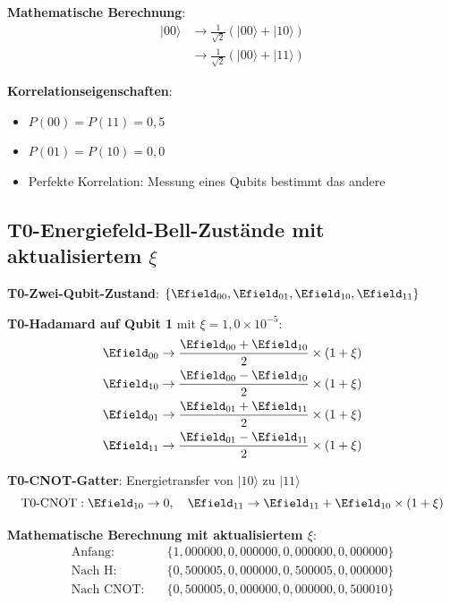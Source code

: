 	\textbf{Mathematische Berechnung}:
	\begin{align}
		|00\rangle &\rightarrow \frac{1}{\sqrt{2}}(|00\rangle + |10\rangle) \\
		&\rightarrow \frac{1}{\sqrt{2}}(|00\rangle + |11\rangle)
	\end{align}
	
	\textbf{Korrelationseigenschaften}:
	\begin{itemize}
		\item $P(00) = P(11) = 0,5$
		\item $P(01) = P(10) = 0,0$
		\item Perfekte Korrelation: Messung eines Qubits bestimmt das andere
	\end{itemize}
	
	\subsection{T0-Energiefeld-Bell-Zustände mit aktualisiertem $\xi$}
	
	\textbf{T0-Zwei-Qubit-Zustand}: $\{\Efield_{00}, \Efield_{01}, \Efield_{10}, \Efield_{11}\}$
	
	\textbf{T0-Hadamard auf Qubit 1} mit $\xi = 1,0 \times 10^{-5}$:
	\begin{align}
		\Efield_{00} &\rightarrow \frac{\Efield_{00} + \Efield_{10}}{2} \times (1 + \xi) \\
		\Efield_{10} &\rightarrow \frac{\Efield_{00} - \Efield_{10}}{2} \times (1 + \xi) \\
		\Efield_{01} &\rightarrow \frac{\Efield_{01} + \Efield_{11}}{2} \times (1 + \xi) \\
		\Efield_{11} &\rightarrow \frac{\Efield_{01} - \Efield_{11}}{2} \times (1 + \xi)
	\end{align}
	
	\textbf{T0-CNOT-Gatter}: Energietransfer von $|10\rangle$ zu $|11\rangle$
	\begin{equation}
		\text{T0-CNOT}: \Efield_{10} \rightarrow 0, \quad \Efield_{11} \rightarrow \Efield_{11} + \Efield_{10} \times (1 + \xi)
	\end{equation}
	
	\textbf{Mathematische Berechnung mit aktualisiertem $\xi$}:
	\begin{align}
		\text{Anfang}: \quad &\{1,000000, 0,000000, 0,000000, 0,000000\} \\
		\text{Nach H}: \quad &\{0,500005, 0,000000, 0,500005, 0,000000\} \\
		\text{Nach CNOT}: \quad &\{0,500005, 0,000000, 0,000000, 0,500010\}
	\end{align}
	
